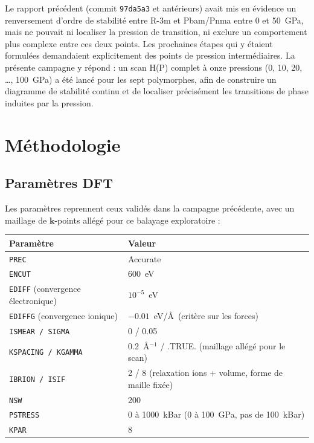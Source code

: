 \documentclass[11pt,a4paper]{article}
\begin{document}
Le rapport précédent (commit \texttt{97da5a3} et antérieurs) avait mis en évidence un
renversement d'ordre de stabilité entre R-3m et Pbam/Pnma entre 0 et 50~GPa, mais ne pouvait
ni localiser la pression de transition, ni exclure un comportement plus complexe entre ces deux
points. Les prochaines étapes qui y étaient formulées demandaient explicitement des points de
pression intermédiaires. La présente campagne y répond : un scan H(P) complet à onze pressions
(0, 10, 20, \dots, 100~GPa) a été lancé pour les sept polymorphes, afin de construire un
diagramme de stabilité continu et de localiser précisément les transitions de phase induites
par la pression.

\section{Méthodologie}

\subsection{Paramètres DFT}

Les paramètres reprennent ceux validés dans la campagne précédente, avec un maillage de
$\mathbf{k}$-points allégé pour ce balayage exploratoire :

\begin{center}
\begin{tabular}{ll}
\toprule
Paramètre & Valeur \\
\midrule
\texttt{PREC} & Accurate \\
\texttt{ENCUT} & 600~eV \\
\texttt{EDIFF} (convergence électronique) & $10^{-5}$~eV \\
\texttt{EDIFFG} (convergence ionique) & $-0.01$~eV/\AA\ (critère sur les forces) \\
\texttt{ISMEAR / SIGMA} & 0 / 0.05 \\
\texttt{KSPACING / KGAMMA} & 0.2~\AA$^{-1}$ / .TRUE. (maillage allégé pour le scan) \\
\texttt{IBRION / ISIF} & 2 / 8 (relaxation ions + volume, forme de maille fixée) \\
\texttt{NSW} & 200 \\
\texttt{PSTRESS} & 0 à 1000~kBar (0 à 100~GPa, pas de 100~kBar) \\
\texttt{KPAR} & 8 \\
\bottomrule
\end{tabular}
\end{center}
\end{document}
